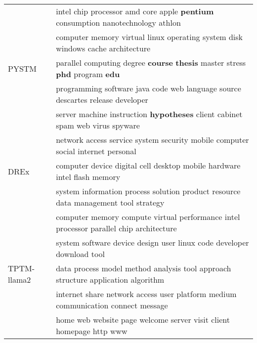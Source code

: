 \begin{table}[ht]
{\begin{tabular}{ll}
\multirow{5}{*}{PYSTM} & intel chip processor amd core apple \textbf{pentium} consumption nanotechnology athlon \\
    & computer memory virtual linux operating system disk windows cache architecture \\
    & parallel computing degree \textbf{course} \textbf{thesis} master stress \textbf{phd} program \textbf{edu} \\
    & programming software java code web language source descartes release developer \\
    & server machine instruction \textbf{hypotheses} client cabinet spam web virus spyware \\\midrule
\multirow{3}{*}{DREx} 
    & network access service system security mobile computer social internet personal \\
    & computer device digital cell desktop mobile hardware intel flash memory \\
    & system information process solution product resource data management tool strategy \\\midrule
\multirow{5}{*}{TPTM-llama2} & computer memory compute virtual performance intel processor parallel chip architecture \\
    & system software device design user linux code developer download tool \\
    & data process model method analysis tool approach structure application algorithm \\
    & internet share network access user platform medium communication connect message \\
    & home web website page welcome server visit client homepage http www \\\bottomrule
\end{tabular}
}
\end{table}

